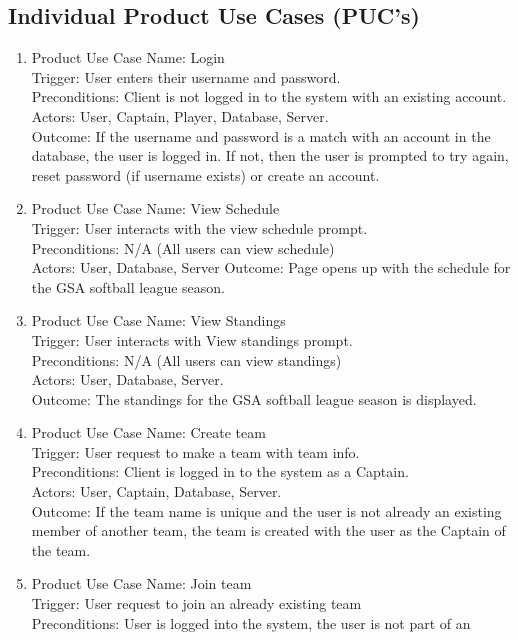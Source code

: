 \documentclass[12pt]{article}
\begin{document}
\subsection{Individual Product Use Cases (PUC's)}
\begin{enumerate}
	\item Product Use Case Name: Login \\
	Trigger: User enters their username and password.\\
	Preconditions: Client is not logged in to the system with an existing account.\\
	Actors: User, Captain, Player, Database, Server.\\
	Outcome: If the username and password is a match with an account in
	the database, the user is logged in. If not, then the user is prompted
	to try again, reset password (if username exists) or create an account.
	\item Product Use Case Name: View Schedule \\
	Trigger: User interacts with the view schedule prompt.\\
	Preconditions: N/A (All users can view schedule)\\
	Actors: User, Database, Server
	Outcome: Page opens up with the schedule for the GSA softball league season.
	\item Product Use Case Name: View Standings \\
	Trigger: User interacts with View standings prompt.\\
	Preconditions: N/A (All users can view standings)\\
	Actors: User, Database, Server.\\
	Outcome: The standings for the GSA softball league season is displayed.
	\item Product Use Case Name: Create team \\
	Trigger: User request to make a team with team info.\\
	Preconditions: Client is logged in to the system as a Captain.\\
	Actors: User, Captain, Database, Server.\\
	Outcome: If the team name is unique and the user is not already an existing member
	of another team, the team is created with the user as the Captain of the team.
	\item Product Use Case Name: Join team \\
	Trigger: User request to join an already existing team\\
	Preconditions: User is logged into the system, the user is not part of an

\end{enumerate}
\end{document}
